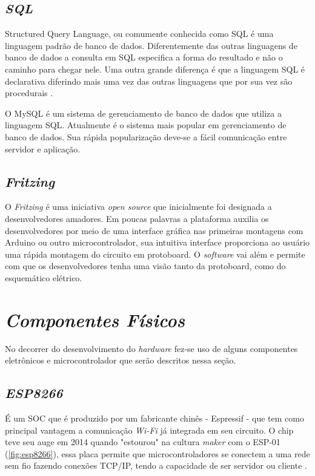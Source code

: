 \subsection[\textit{SQL}]{\textit{SQL}}\label{sql}
Structured Query Language, ou comumente conhecida como SQL é uma linguagem padrão de banco de dados. 
Diferentemente das outras linguagens de banco de dados a consulta em SQL especifica a forma do resultado e não o caminho para chegar nele. Uma outra
grande diferença é que a linguagem SQL é declarativa diferindo mais uma vez das outras linguagens que por sua vez são procedurais \cite{ref-sqlhisto}.

O MySQL é um sistema de gerenciamento de banco de dados que utiliza a linguagem SQL. Atualmente é o sistema mais popular em gerenciamento de 
banco de dados. Sua rápida popularização deve-se a fácil comunicação entre servidor e aplicação.

\subsection[\textit{Fritzing}]{\textit{Fritzing}}\label{fritzing}
O \textit{Fritzing} é uma iniciativa \textit{open source} que inicialmente foi
designada a desenvolvedores amadores. Em poucas palavras
a plataforma auxilia os desenvolvedores por meio de uma interface gráfica nas primeiras montagens com Arduino
ou outro microcontrolador, sua intuitiva interface proporciona ao usuário uma rápida montagem do circuito em protoboard. O \textit{software} vai além
e permite com que os desenvolvedores tenha uma visão tanto da protoboard, como do esquemático elétrico. 


\section[\textit{Componentes Físicos}]{\textit{Componentes Físicos}}\label{comp-fisico}
No decorrer do desenvolvimento do \textit{hardware} fez-se uso de alguns componentes eletrônicos e microcontrolador que serão descritos nessa seção.
\subsection[\textit{ESP8266}]{\textit{ESP8266}}\label{esp}
É um SOC que é produzido por um fabricante chinês - Espressif - que tem como principal vantagem a comunicação \textit{Wi-Fi} já integrada em seu circuito.
O chip teve seu auge em 2014 quando "estourou" na cultura \textit{maker} com o ESP-01 (\autoref{fig:esp8266}), essa placa permite que microcontroladores se conectem a uma rede
sem fio  fazendo conexões TCP/IP, tendo a capacidade de ser servidor ou cliente \cite{ref-esp8266h}.

